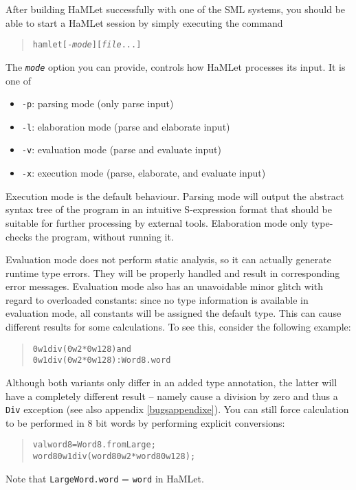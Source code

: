 \documentclass[twoside,titlepage]{article}
\begin{document}
After building HaMLet successfully with one of the SML systems, you should be able to start a HaMLet session by simply executing the command

\begin{quote}
\begin{alltt}
hamlet [-{\it{mode}}] [{\it file} ...]
\end{alltt}
\end{quote}

The {\tt\it mode} option you can provide, controls how HaMLet processes its input. It is one of

\begin{itemize}
\setlength{\parskip}{0ex}
\item {\tt -p}: parsing mode (only parse input)
\item {\tt -l}: elaboration mode (parse and elaborate input)
\item {\tt -v}: evaluation mode (parse and evaluate input)
\item {\tt -x}: execution mode (parse, elaborate, and evaluate input)
\end{itemize}

Execution mode is the default behaviour. Parsing mode will output the abstract syntax tree of the program in an intuitive S-expression format that should be suitable for further processing by external tools. Elaboration mode only type-checks the program, without running it.

Evaluation mode does not perform static analysis, so it can actually generate runtime type errors. They will be properly handled and result in corresponding error messages. Evaluation mode also has an unavoidable minor glitch with regard to overloaded constants: since no type information is available in evaluation mode, all constants will be assigned the default type. This can cause different results for some calculations. To see this, consider the following example:

\begin{quote}
\begin{alltt}
0w1 div (0w2 * 0w128)                {\rm and}
0w1 div (0w2 * 0w128) : Word8.word
\end{alltt}
\end{quote}
Although both variants only differ in an added type annotation, the latter will have a completely different result -- namely cause a division by zero and thus a {\tt Div} exception (see also appendix \ref{bugsappendixe}). You can still force calculation to be performed in 8 bit words by performing explicit conversions:
\begin{quote}
\begin{alltt}
val word8 = Word8.fromLarge;
word8 0w1 div (word8 0w2 * word8 0w128);
\end{alltt}
\end{quote}
Note that {\tt LargeWord.word} = {\tt word} in HaMLet.
\end{document}
